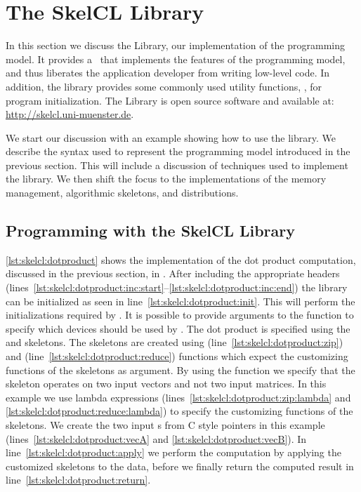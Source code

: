 \section{The SkelCL Library}
\label{section:skelcl-library}
In this section we discuss the \SkelCL Library, our implementation of the \SkelCL programming model.
It provides a \Cpp~\API that implements the features of the \SkelCL programming model, and thus liberates the application developer from writing low-level code.
In addition, the library provides some commonly used utility functions, \eg, for program initialization.
The \SkelCL Library is open source software and available at: \url{http://skelcl.uni-muenster.de}.

We start our discussion with an example showing how to use the \SkelCL library.
We describe the syntax used to represent the \SkelCL programming model introduced in the previous section.
This will include a discussion of \Cpp techniques used to implement the library.
We then shift the focus to the implementations of the memory management, algorithmic skeletons, and distributions.










\subsection{Programming with the SkelCL Library}

\autoref{lst:skelcl:dotproduct} shows the implementation of the dot product computation, discussed in the previous section, in \SkelCL.
After including the appropriate \SkelCL headers (lines~\autoref{lst:skelcl:dotproduct:inc:start}--\autoref{lst:skelcl:dotproduct:inc:end}) the \SkelCL library can be initialized as seen in line~\autoref{lst:skelcl:dotproduct:init}.
This will perform the initializations required by \OpenCL.
It is possible to provide arguments to the  function to specify which \OpenCL devices should be used by \SkelCL.
The dot product is specified using the \zip and \reduce skeletons.
The skeletons are created using  (line~\autoref{lst:skelcl:dotproduct:zip}) and  (line~\autoref{lst:skelcl:dotproduct:reduce}) functions which expect the customizing functions of the skeletons as argument.
By using the  function we specify that the \zip skeleton operates on two input vectors and not two input matrices.
In this example we use \Cpp lambda expressions (lines~\autoref{lst:skelcl:dotproduct:zip:lambda} and \autoref{lst:skelcl:dotproduct:reduce:lambda}) to specify the customizing functions of the skeletons.
We create the two input s from C style pointers in this example (lines~\autoref{lst:skelcl:dotproduct:vecA} and \autoref{lst:skelcl:dotproduct:vecB}).
In line~\autoref{lst:skelcl:dotproduct:apply} we perform the computation by applying the customized skeletons to the data, before we finally return the computed result in line~\autoref{lst:skelcl:dotproduct:return}.

